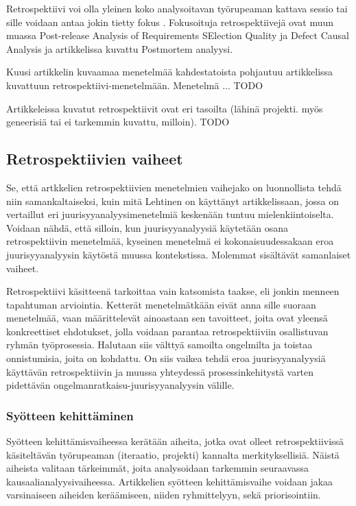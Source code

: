 Retrospektiivi voi olla yleinen koko analysoitavan työrupeaman kattava sessio tai sille voidaan antaa jokin tietty fokus \citep{staalhane2003post}. Fokusoituja retrospektiivejä ovat muun muassa Post-release Analysis of Requirements SElection Quality \citep{karlsson2006case} ja Defect Causal Analysis \citep{card1998learning} ja artikkelissa \citep{de2004learning} kuvattu Postmortem analyysi.

Kuusi artikkelin kuvaamaa menetelmää kahdestatoista pohjautuu artikkelissa \citep{birk2002postmortem} kuvattuun retrospektiivi-menetelmään. Menetelmä ... TODO


Artikkeleissa kuvatut retrospektiivit ovat eri tasoilta (lähinä projekti. myös geneerisiä tai ei tarkemmin kuvattu, milloin). TODO

\subsection{Retrospektiivien vaiheet}
Se, että artkkelien retrospektiivien menetelmien vaihejako on luonnollista tehdä niin samankaltaiseksi, kuin mitä Lehtinen on käyttänyt artikkelissaan, jossa on vertaillut eri juurisyyanalyysimenetelmiä keskenään \citep{Lehtinen2011} tuntuu mielenkiintoiselta. Voidaan nähdä, että silloin, kun juurisyyanalyysiä käytetään osana retrospektiivin menetelmää, kyseinen menetelmä ei kokonaisuudessakaan eroa juurisyyanalyysin käytöstä muussa kontekstissa. Molemmat sisältävät samanlaiset vaiheet.

Retrospektiivi käsitteenä tarkoittaa vain katsomista taakse, eli jonkin menneen tapahtuman arviointia. Ketterät menetelmätkään eivät anna sille suoraan menetelmää, vaan määrittelevät ainoastaan sen tavoitteet, joita ovat yleensä konkreettiset ehdotukset, jolla voidaan parantaa retrospektiiviin osallistuvan ryhmän työprosessia. Halutaan siis välttyä samoilta ongelmilta ja toistaa onnistumisia, joita on kohdattu. On siis vaikea tehdä eroa juurisyyanalyysiä käyttävän retrospektiivin ja muussa yhteydessä prosessinkehitystä varten pidettävän ongelmanratkaisu-juurisyyanalyysin välille.

\subsubsection{Syötteen kehittäminen}
Syötteen kehittämisvaiheessa kerätään aiheita, jotka ovat olleet retrospektiivissä käsiteltävän työrupeaman (iteraatio, projekti) kannalta merkityksellisiä. Näistä aiheista valitaan tärkeimmät, joita analysoidaan tarkemmin seuraavassa kausaalianalyysivaiheessa. Artikkelien syötteen kehittämisvaihe voidaan jakaa varsinaiseen aiheiden keräämiseen, niiden ryhmittelyyn, sekä priorisointiin.

